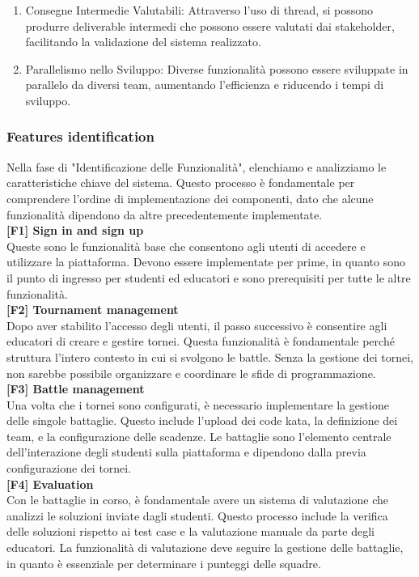 \begin{enumerate}
    \item Consegne Intermedie Valutabili: Attraverso l'uso di thread, si possono produrre deliverable intermedi che possono essere valutati dai stakeholder, facilitando la validazione del sistema realizzato.
    \item Parallelismo nello Sviluppo: Diverse funzionalità possono essere sviluppate in parallelo da diversi team, aumentando l'efficienza e riducendo i tempi di sviluppo.
\end{enumerate}

\subsubsection{Features identification}
Nella fase di "Identificazione delle Funzionalità", elenchiamo e analizziamo le caratteristiche chiave del sistema. Questo processo è fondamentale per comprendere l'ordine di implementazione dei componenti, dato che alcune funzionalità dipendono da altre precedentemente implementate.\\
\noindent \textbf{[F1] Sign in and sign up}\\
 Queste sono le funzionalità base che consentono agli utenti di accedere e utilizzare la piattaforma. Devono essere implementate per prime, in quanto sono il punto di ingresso per studenti ed educatori e sono prerequisiti per tutte le altre funzionalità.\\
\noindent \textbf{[F2] Tournament management}\\
 Dopo aver stabilito l'accesso degli utenti, il passo successivo è consentire agli educatori di creare e gestire tornei. Questa funzionalità è fondamentale perché struttura l'intero contesto in cui si svolgono le battle. Senza la gestione dei tornei, non sarebbe possibile organizzare e coordinare le sfide di programmazione.\\
\noindent \textbf{[F3] Battle management}\\
 Una volta che i tornei sono configurati, è necessario implementare la gestione delle singole battaglie. Questo include l'upload dei code kata, la definizione dei team, e la configurazione delle scadenze. Le battaglie sono l'elemento centrale dell'interazione degli studenti sulla piattaforma e dipendono dalla previa configurazione dei tornei.\\
\noindent \textbf{[F4] Evaluation}\\
Con le battaglie in corso, è fondamentale avere un sistema di valutazione che analizzi le soluzioni inviate dagli studenti. Questo processo include la verifica delle soluzioni rispetto ai test case e la valutazione manuale da parte degli educatori. La funzionalità di valutazione deve seguire la gestione delle battaglie, in quanto è essenziale per determinare i punteggi delle squadre.\\
